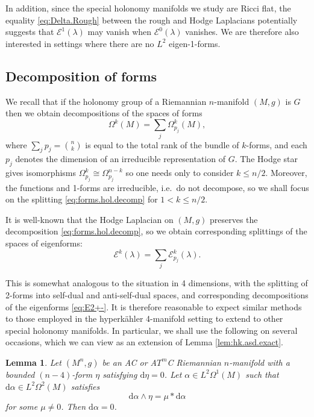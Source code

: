 \documentclass{article}
\newtheorem{lem}[thm]{Lemma}
\theoremstyle{definition}
\numberwithin{thm}{section}
\numberwithin{equation}{section}
\def\d{\mathrm{d}}
\begin{document}
In addition, since the special holonomy manifolds we study are Ricci flat, the equality \eqref{eq:Delta.Rough} between the rough and Hodge Laplacians potentially suggests that $\mathcal{E}^1(\lambda)$ may vanish when $\mathcal{E}^0(\lambda)$ vanishes.  We are therefore also interested in settings where there are no $L^2$ eigen-1-forms.
 
\subsection{Decomposition of forms}

We recall that if the holonomy group of a Riemannian $n$-manifold $(M,g)$ is $G$ then we obtain decompositions of the spaces of forms 
\begin{equation}\label{eq:forms.hol.decomp}
    \Omega^k(M)=\sum_j\Omega^k_{p_j}(M),
\end{equation}
where $\sum_jp_j=\binom{n}{k}$ is equal to the total rank of the bundle of $k$-forms, and each $p_j$ denotes the dimension of an irreducible   representation of $G$.   The Hodge star gives isomorphisms $\Omega^k_{p_j}\cong \Omega^{n-k}_{p_j}$ so one needs only to consider $k\leq n/2$.  Moreover, the functions and 1-forms are irreducible, i.e.~do not decompose, so we shall focus on the splitting \eqref{eq:forms.hol.decomp} for $1<k\leq n/2$.

It is well-known that the Hodge Laplacian on $(M,g)$ preserves the decomposition \eqref{eq:forms.hol.decomp}, so we obtain corresponding splittings of the spaces of eigenforms:
\begin{equation}\label{eq:eigenforms.hol}
    \mathcal{E}^k(\lambda)=\sum_j\mathcal{E}^k_{p_j}(\lambda).
\end{equation}

This is somewhat analogous to the situation in 4 dimensions, with the splitting of 2-forms into self-dual and anti-self-dual spaces, and corresponding decompositions of the eigenforms \eqref{eq:E2+-}.  
It is therefore reasonable to expect similar methods to those employed in the hyperk\"ahler 4-manifold setting to extend to other special holonomy manifolds.  In particular, we shall use the following on several occasions, which we can view as an extension of Lemma \ref{lem:hk.asd.exact}.
 

\begin{lem}\label{lem:exact.vanish}
    Let $(M^n,g)$ be an AC or A$T^m$C Riemannian $n$-manifold with a bounded $(n-4)$-form $\eta$ satisfying $\d\eta=0$.  Let $\alpha\in L^2\Omega^1(M)$ such that $\d\alpha\in L^2\Omega^2(M)$ satisfies
    \begin{equation}\label{eq:ASD.shol}
        \d\alpha\wedge \eta=\mu *\d\alpha
    \end{equation}
    for some $\mu\neq 0$.  Then $\d\alpha=0$.
\end{lem}
\end{document}
